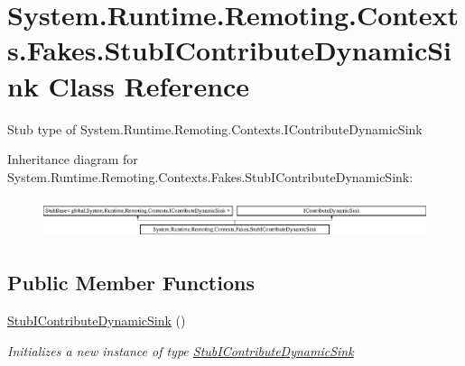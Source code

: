 \hypertarget{class_system_1_1_runtime_1_1_remoting_1_1_contexts_1_1_fakes_1_1_stub_i_contribute_dynamic_sink}{\section{System.\-Runtime.\-Remoting.\-Contexts.\-Fakes.\-Stub\-I\-Contribute\-Dynamic\-Sink Class Reference}
\label{class_system_1_1_runtime_1_1_remoting_1_1_contexts_1_1_fakes_1_1_stub_i_contribute_dynamic_sink}
}


Stub type of System.\-Runtime.\-Remoting.\-Contexts.\-I\-Contribute\-Dynamic\-Sink 


Inheritance diagram for System.\-Runtime.\-Remoting.\-Contexts.\-Fakes.\-Stub\-I\-Contribute\-Dynamic\-Sink\-:\begin{figure}[H]
\begin{center}
\leavevmode
\includegraphics[height=1.196581cm]{class_system_1_1_runtime_1_1_remoting_1_1_contexts_1_1_fakes_1_1_stub_i_contribute_dynamic_sink}
\end{center}
\end{figure}
\subsection*{Public Member Functions}
\begin{DoxyCompactItemize}
\item 
\hyperlink{class_system_1_1_runtime_1_1_remoting_1_1_contexts_1_1_fakes_1_1_stub_i_contribute_dynamic_sink_a338888f810dc5990865a76c47870a7e9}{Stub\-I\-Contribute\-Dynamic\-Sink} ()
\begin{DoxyCompactList}\small\item\em Initializes a new instance of type \hyperlink{class_system_1_1_runtime_1_1_remoting_1_1_contexts_1_1_fakes_1_1_stub_i_contribute_dynamic_sink}{Stub\-I\-Contribute\-Dynamic\-Sink}\end{DoxyCompactList}\end{DoxyCompactItemize}
